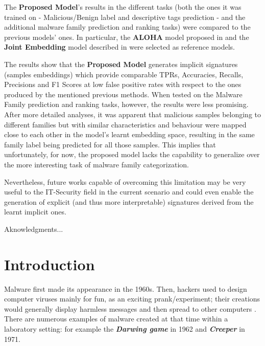 \documentclass[pdfa%
,cucitura%
]{toptesi}
\begin{document}
The \textbf{Proposed Model}'s results in the different tasks (both the ones it was trained on - Malicious/Benign label and descriptive tags prediction - and the additional malware family prediction and ranking tasks) were compared to the previous models' ones. In particular, the \textbf{ALOHA} model proposed in \cite{ruddALOHA} and the \textbf{Joint Embedding} model described in \cite{DucauAMDATSE} were selected as reference models.

The results show that the \textbf{Proposed Model} generates implicit signatures (samples embeddings) which provide comparable TPRs, Accuracies, Recalls, Precisions and F1 Scores at low false positive rates with respect to the ones produced by the mentioned previous methods. When tested on the Malware Family prediction and ranking tasks, however, the results were less promising. After more detailed analyses, it was apparent that malicious samples belonging to different families but with similar characteristics and behaviour were mapped close to each other in the model's learnt embedding space, resulting in the same family label being predicted for all those samples. This implies that unfortunately, for now, the proposed model lacks the capability to generalize over the more interesting task of malware family categorization.

Nevertheless, future works capable of overcoming this limitation may be very useful to the IT-Security field in the current scenario and could even enable the generation of explicit (and thus more interpretable) signatures derived from the learnt implicit ones.

\ringraziamenti

Aknowledgments...



\indici
\listoffigures
\listoftables

\mainmatter


\chapter{Introduction}
Malware first made its appearance in the 1960s. Then, hackers used to design computer viruses mainly for fun, as an exciting prank/experiment; their creations would generally display harmless messages and then spread to other computers \cite{ReganWIM}. There are numerous examples of malware created at that time within a laboratory setting: for example the \textbf{\textit{Darwing game}} in 1962 and \textbf{\textit{Creeper}} in 1971.
\end{document}
